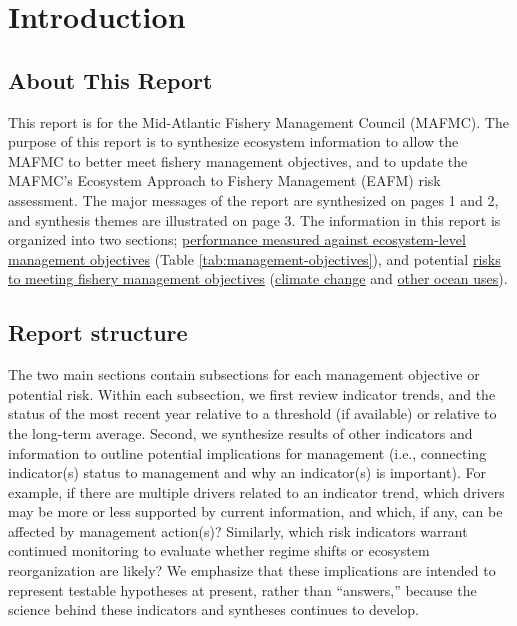 \documentclass[
  10pt,
]{article}
\author{}
\date{\vspace{-2.5em}}
\begin{document}
\setcounter{page}{4}
\thispagestyle{fancy}

\hypertarget{introduction}{%
\section{Introduction}\label{introduction}}

\hypertarget{about-this-report}{%
\subsection{About This Report}\label{about-this-report}}

This report is for the Mid-Atlantic Fishery Management Council (MAFMC).
The purpose of this report is to synthesize ecosystem information to
allow the MAFMC to better meet fishery management objectives, and to
update the MAFMC's Ecosystem Approach to Fishery Management (EAFM) risk
assessment. The major messages of the report are synthesized on pages 1
and 2, and synthesis themes are illustrated on page 3. The information
in this report is organized into two sections;
\protect\hyperlink{performance-relative-to-fishery-management-objectives}{performance
measured against ecosystem-level management objectives} (Table
\ref{tab:management-objectives}), and potential
\protect\hyperlink{risks-to-meeting-fishery-management-objectives}{risks
to meeting fishery management objectives}
(\protect\hyperlink{climate-and-ecosystem-productivity}{climate change}
and \protect\hyperlink{other-ocean-uses-offshore-wind}{other ocean
uses}).

\hypertarget{report-structure}{%
\subsection{Report structure}\label{report-structure}}

The two main sections contain subsections for each management objective
or potential risk. Within each subsection, we first review indicator
trends, and the status of the most recent year relative to a threshold
(if available) or relative to the long-term average. Second, we
synthesize results of other indicators and information to outline
potential implications for management (i.e., connecting indicator(s)
status to management and why an indicator(s) is important). For example,
if there are multiple drivers related to an indicator trend, which
drivers may be more or less supported by current information, and which,
if any, can be affected by management action(s)? Similarly, which risk
indicators warrant continued monitoring to evaluate whether regime
shifts or ecosystem reorganization are likely? We emphasize that these
implications are intended to represent testable hypotheses at present,
rather than ``answers,'' because the science behind these indicators and
syntheses continues to develop.
\end{document}
